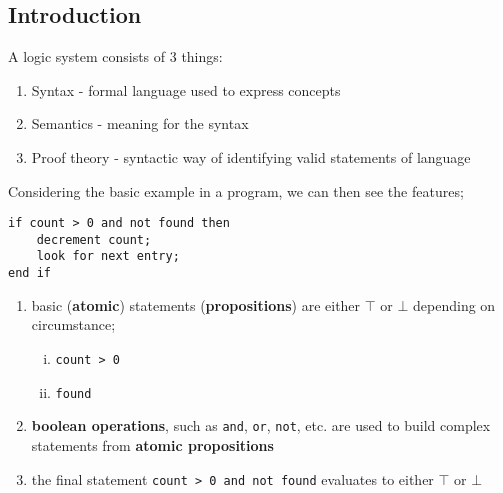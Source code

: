 \documentclass[a4paper, 12pt]{article}
\begin{document}
        \subsection*{Introduction}
            A logic system consists of 3 things:
            \begin{enumerate}[1.]
                \itemsep0em
                \item Syntax - formal language used to express concepts
                \item Semantics - meaning for the syntax
                \item Proof theory - syntactic way of identifying valid statements of language
            \end{enumerate}
            Considering the basic example in a program, we can then see the features;
            \begin{verbatim}
if count > 0 and not found then
    decrement count;
    look for next entry;
end if
            \end{verbatim}
            \begin{enumerate}[1.]
                \itemsep0em
                \item basic (\textbf{atomic}) statements (\textbf{propositions}) are either $\top$ or $\bot$ depending on circumstance;
                    \begin{enumerate}[i.]
                        \itemsep0em
                        \item \texttt{count > 0}
                        \item \texttt{found}
                    \end{enumerate}
                \item \textbf{boolean operations}, such as \texttt{and}, \texttt{or}, \texttt{not}, etc. are used to build complex statements from \textbf{atomic propositions}
                \item the final statement \texttt{count > 0 and not found} evaluates to either $\top$ or $\bot$
            \end{enumerate}
\end{document}
